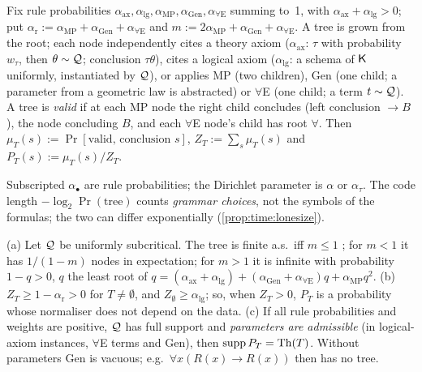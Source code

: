 \begin{definition}\label{def:model:lone}
Fix rule probabilities $\alpha_{\mathrm{ax}},\alpha_{\mathrm{lg}},\alpha_{\mathrm{MP}},\alpha_{\mathrm{Gen}},\alpha_{\forall\mathrm E}$ summing to~1, with $\alpha_{\mathrm{ax}}+\alpha_{\mathrm{lg}}>0$; put $\alpha_{\mathrm r}:=\alpha_{\mathrm{MP}}+\alpha_{\mathrm{Gen}}+\alpha_{\forall\mathrm E}$ and $m:=2\alpha_{\mathrm{MP}}+\alpha_{\mathrm{Gen}}+\alpha_{\forall\mathrm E}$. A tree is grown from the root; each node independently
cites a theory axiom ($\alpha_{\mathrm{ax}}$: $\tau$ with probability $w_\tau$, then $\theta\sim\mathcal{Q}$; conclusion $\tau\theta$),
cites a logical axiom ($\alpha_{\mathrm{lg}}$: a schema of $\mathsf{K}$ uniformly, instantiated by $\mathcal{Q}$),
or applies MP (two children), Gen (one child; a parameter from a geometric law is abstracted) or $\forall$E (one child; a term $t\sim\mathcal{Q}$).
A tree is \emph{valid} if at each MP node the right child concludes (left conclusion $\to B$), the node concluding $B$, and each $\forall$E node's child has root $\forall$. Then $\mu_T(s):=\Pr[\text{valid, conclusion }s]$, $Z_T:=\sum_s\mu_T(s)$ and $P_T(s):=\mu_T(s)/Z_T$.
\end{definition}

Subscripted $\alpha_\bullet$ are rule probabilities; the Dirichlet parameter is $\alpha$ or $\alpha_\tau$. The code length $-\log_2\Pr(\text{tree})$ counts \emph{grammar choices}, not the symbols of the formulas; the two can differ exponentially (\cref{prop:time:lonesize}).

\begin{lemma}\label{lem:model:lone}
(a) Let $\mathcal{Q}$ be uniformly subcritical. The tree is finite a.s.\ iff $m\le1$ \citep[Ch.~I; numbering not checked]{athreya1972branching}; for $m<1$ it has $1/(1-m)$ nodes in expectation; for $m>1$ it is infinite with probability $1-q>0$, $q$ the least root of $q=(\alpha_{\mathrm{ax}}+\alpha_{\mathrm{lg}})+(\alpha_{\mathrm{Gen}}+\alpha_{\forall\mathrm E})q+\alpha_{\mathrm{MP}}q^2$.
(b) $Z_T\ge1-\alpha_{\mathrm r}>0$ for $T\ne\emptyset$, and $Z_\emptyset\ge\alpha_{\mathrm{lg}}$; so, when $Z_T>0$, $P_T$ is a probability whose normaliser does not depend on the data.
(c) If all rule probabilities and weights are positive, $\mathcal{Q}$ has full support and \emph{parameters are admissible} (in logical-axiom instances, $\forall$E terms and Gen), then $\operatorname{supp}P_T=\mathrm{Th}(T)$. Without parameters Gen is vacuous; e.g.\ $\forall x(R(x)\to R(x))$ then has no tree.
\end{lemma}

